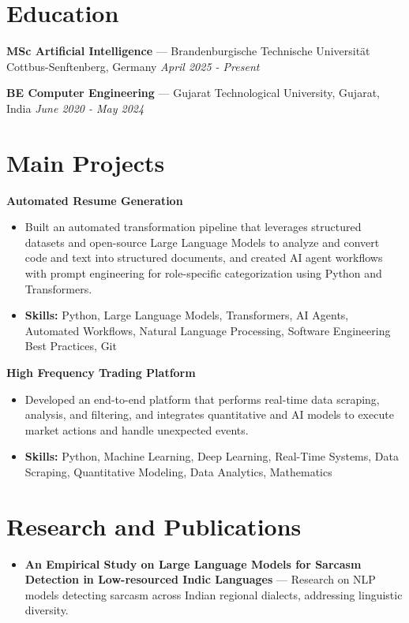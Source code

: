 \documentclass[a4paper,10pt]{article}
\begin{document}
\section*{Education}
\textbf{MSc Artificial Intelligence} — Brandenburgische Technische Universität Cottbus-Senftenberg, Germany \hfill \textit{April 2025 - Present}\par
\vspace{1.5pt}
\textbf{BE Computer Engineering} — Gujarat Technological University, Gujarat, India \hfill \textit{June 2020 - May 2024}\par

\section*{Main Projects}
\textbf{Automated Resume Generation}\par
\vspace{1pt}
\begin{itemize}
  \item Built an automated transformation pipeline that leverages structured datasets and open-source Large Language Models to analyze and convert code and text into structured documents, and created AI agent workflows with prompt engineering for role-specific categorization using Python and Transformers.
  \item \textbf{Skills:} Python, Large Language Models, Transformers, AI Agents, Automated Workflows, Natural Language Processing, Software Engineering Best Practices, Git
\end{itemize}
\vspace{3pt}
\textbf{High Frequency Trading Platform}\par
\vspace{1pt}
\begin{itemize}
  \item Developed an end-to-end platform that performs real-time data scraping, analysis, and filtering, and integrates quantitative and AI models to execute market actions and handle unexpected events.
  \item \textbf{Skills:} Python, Machine Learning, Deep Learning, Real-Time Systems, Data Scraping, Quantitative Modeling, Data Analytics, Mathematics
\end{itemize}

\section*{Research and Publications}
\begin{itemize}
\item \textbf{An Empirical Study on Large Language Models for Sarcasm Detection in Low-resourced Indic Languages} — Research on NLP models detecting sarcasm across Indian regional dialects, addressing linguistic diversity.
\end{itemize}
\end{document}
